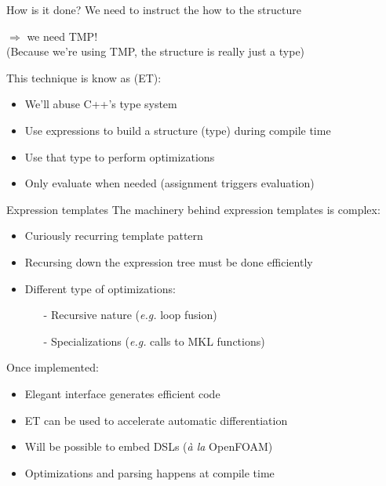 \documentclass{beamer}
\begin{document}
\begin{frame}{How is it done?}
	We need  to instruct the  how to  the structure
	\begin{center}
		$\Rightarrow$ we need TMP!\\
		
		(Because we're using TMP, the structure is really just a type)
	\end{center}
	This technique is know as  (ET):
	\begin{itemize}
		\item We'll abuse C++'s type system
		\item Use expressions to build a structure (type) during compile time
		\item Use that type to perform optimizations
		\item Only evaluate when needed (assignment triggers evaluation)
	\end{itemize}
\end{frame}

\begin{frame}{Expression templates}
	The machinery behind expression templates is complex:
	\begin{itemize}
		\item Curiously recurring template pattern
		\item Recursing down the expression tree must be done efficiently
		\item Different type of optimizations:
		\begin{itemize}
			\item[-] Recursive nature (\textit{e.g.} loop fusion)
			\item[-] Specializations (\textit{e.g.} calls to MKL functions)
		\end{itemize}
	\end{itemize}

	Once implemented:
	\begin{itemize}
		\item Elegant interface generates efficient code
		\item ET can be used to accelerate automatic differentiation
		\item Will be possible to embed DSLs (\textit{à la} OpenFOAM)
		\item Optimizations and parsing happens at compile time
	\end{itemize}
\end{frame}
\end{document}
